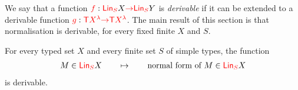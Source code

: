 We say that a function ${\color{red}{f}} : {\color{red}{\mathsf{Lin}_{S}}} X {\color{red}{\to}} {\color{red}{\mathsf{Lin}_{S}}} Y$ is \emph{derivable} if it can be extended to a derivable function ${\color{red}{g}} : {\color{red}{\mathsf T}} {\color{red}{X^\lambda}} {\color{red}{\to}} {\color{red}{\mathsf T}} {\color{red}{X^\lambda}}$. The main result of this section is that normalisation is derivable, for every fixed finite $X$ and $S$. 
\begin{proposition}\label{prop:one-register} 
    For every typed set $X$ and every finite set $S$ of simple types, the function 
    \begin{align*}
        M \in  {\color{red}{\mathsf{Lin}_{S}}} X \qquad \mapsto \qquad \text{normal form of $M$} \in  {\color{red}{\mathsf{Lin}_{S}}} X
    \end{align*}
    is derivable.
\end{proposition}